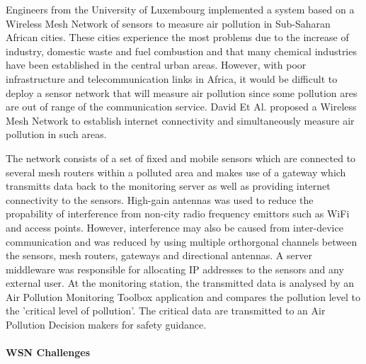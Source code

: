 Engineers from the University of Luxembourg implemented a system based on a Wireless Mesh Network of sensors to measure air pollution in Sub-Saharan African cities. These cities experience the most problems due to the increase of industry, domestic waste and fuel combustion and that many chemical industries have been established in the central urban areas. However, with poor infrastructure and telecommunication links in Africa, it would be difficult to deploy a sensor network that will measure air pollution since some pollution ares are out of range of the communication service. David Et Al. proposed a Wireless Mesh Network to establish internet connectivity and simultaneously measure air pollution in such areas.

The network consists of a set of fixed and mobile sensors which are connected to several mesh routers within a polluted area and makes use of a gateway which transmitts data back to the monitoring server as well as providing internet connectivity to the sensors. High-gain antennas was used to reduce the propability of interference from non-city radio frequency emittors such as WiFi and access points. However, interference may also be caused from inter-device communication and was reduced by using multiple orthorgonal channels between the sensors, mesh routers, gateways and directional antennas. A server middleware was responsible for allocating IP addresses to the sensors and any external user. At the monitoring station, the transmitted data is analysed by an Air Pollution Monitoring Toolbox application and compares the pollution level to the 'critical level of pollution'. The critical data are transmitted to an Air Pollution Decision makers for safety guidance.

\paragraph{WSN Challenges}

